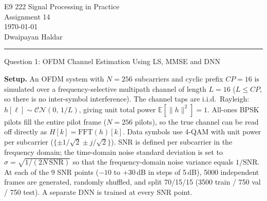 \documentclass[12pt,a4paper,onecolumn]{exam}
\newcommand{\questionheader}[1]{%
  \begin{tcolorbox}[
    enhanced,
    colback=black,
    coltext=white,
    boxrule=0pt,
    fontupper=\Large\bfseries,
    arc=4mm
  ]
  #1
  \end{tcolorbox}%
}
\begin{document}
\begingroup
    \centering
    \LARGE E9 222 Signal Processing in Practice\\
    \LARGE Assignment 14\\[0.5em]
    \large \today\\[0.5em]
    \large Dwaipayan Haldar \par
\endgroup
\noindent\rule{\textwidth}{0.5pt}
\printanswers
\renewcommand{\solutiontitle}{\noindent\textbf{Ans:}\enspace}
\setlength{\parskip}{2pt}


\questionheader{Question 1: OFDM Channel Estimation Using LS, MMSE and DNN}

\begin{solution}

\textbf{Setup.}
An OFDM system with $N=256$ subcarriers and cyclic prefix $CP=16$ is simulated over a
frequency-selective multipath channel of length $L=16$ ($L \le CP$, so there is no
inter-symbol interference).  The channel taps are i.i.d.\ Rayleigh:
$h[\ell] \sim \mathcal{CN}(0,\,1/L)$, giving unit total power
$\mathbb{E}[\|h\|^2]=1$.  All-ones BPSK pilots fill the entire pilot frame
($N=256$ pilots), so the true channel can be read off directly as
$H[k]=\mathrm{FFT}(h)[k]$.  Data symbols use 4-QAM with unit power per
subcarrier ($\{{\pm 1/\!\sqrt{2}\pm j/\!\sqrt{2}}\}$).
SNR is defined per subcarrier in the frequency domain; the time-domain noise
standard deviation is set to $\sigma = \sqrt{1/(2N\,\mathrm{SNR})}$ so that the
frequency-domain noise variance equals $1/\mathrm{SNR}$.
At each of the 9 SNR points ($-10$ to $+30$\,dB in steps of 5\,dB), 5000
independent frames are generated, randomly shuffled, and split 70/15/15
(3500 train / 750 val / 750 test).  A separate DNN is trained at every SNR point.


\end{solution}
\end{document}
